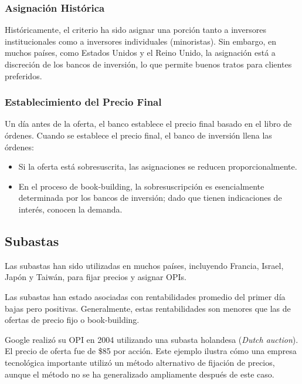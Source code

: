 \subsubsection{Asignación Histórica}

Históricamente, el criterio ha sido asignar una porción tanto a inversores institucionales como a inversores individuales (minoristas). Sin embargo, en muchos países, como Estados Unidos y el Reino Unido, la asignación está a discreción de los bancos de inversión, lo que permite buenos tratos para clientes preferidos.

\subsubsection{Establecimiento del Precio Final}

Un día antes de la oferta, el banco establece el precio final basado en el libro de órdenes. Cuando se establece el precio final, el banco de inversión llena las órdenes:

\begin{itemize}
\item Si la oferta está sobresuscrita, las asignaciones se reducen proporcionalmente.
\item En el proceso de book-building, la sobresuscripción es esencialmente determinada por los bancos de inversión; dado que tienen indicaciones de interés, conocen la demanda.
\end{itemize}

\subsection{Subastas}

Las subastas han sido utilizadas en muchos países, incluyendo Francia, Israel, Japón y Taiwán, para fijar precios y asignar OPIs.

\begin{proposicion}
Las subastas han estado asociadas con rentabilidades promedio del primer día bajas pero positivas. Generalmente, estas rentabilidades son menores que las de ofertas de precio fijo o book-building.
\end{proposicion}

\begin{ejemplo}
Google realizó su OPI en 2004 utilizando una subasta holandesa (\textit{Dutch auction}). El precio de oferta fue de \$85 por acción. Este ejemplo ilustra cómo una empresa tecnológica importante utilizó un método alternativo de fijación de precios, aunque el método no se ha generalizado ampliamente después de este caso.
\end{ejemplo}

